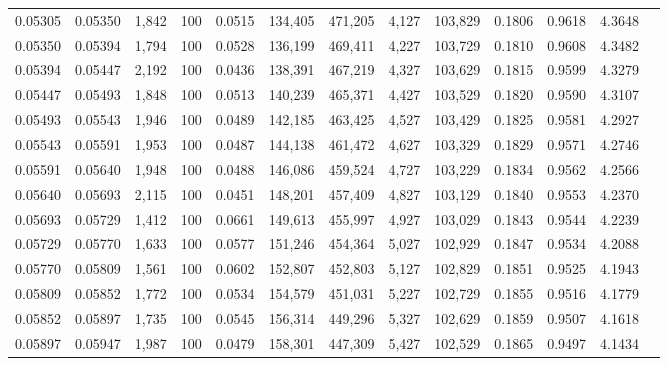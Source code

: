 \begin{tabular}{rrrrrrrrrrrrr}
0.05305 & 0.05350 & 1,842 & 100 &                                     0.0515 & 134,405 & 471,205 &   4,127 & 103,829 & 0.1806 & 0.9618 & 4.3648 \\
0.05350 & 0.05394 & 1,794 & 100 &                                     0.0528 & 136,199 & 469,411 &   4,227 & 103,729 & 0.1810 & 0.9608 & 4.3482 \\
0.05394 & 0.05447 & 2,192 & 100 &                                     0.0436 & 138,391 & 467,219 &   4,327 & 103,629 & 0.1815 & 0.9599 & 4.3279 \\
0.05447 & 0.05493 & 1,848 & 100 &                                     0.0513 & 140,239 & 465,371 &   4,427 & 103,529 & 0.1820 & 0.9590 & 4.3107 \\
0.05493 & 0.05543 & 1,946 & 100 &                                     0.0489 & 142,185 & 463,425 &   4,527 & 103,429 & 0.1825 & 0.9581 & 4.2927 \\
0.05543 & 0.05591 & 1,953 & 100 &                                     0.0487 & 144,138 & 461,472 &   4,627 & 103,329 & 0.1829 & 0.9571 & 4.2746 \\
0.05591 & 0.05640 & 1,948 & 100 &                                     0.0488 & 146,086 & 459,524 &   4,727 & 103,229 & 0.1834 & 0.9562 & 4.2566 \\
0.05640 & 0.05693 & 2,115 & 100 &                                     0.0451 & 148,201 & 457,409 &   4,827 & 103,129 & 0.1840 & 0.9553 & 4.2370 \\
0.05693 & 0.05729 & 1,412 & 100 &                                     0.0661 & 149,613 & 455,997 &   4,927 & 103,029 & 0.1843 & 0.9544 & 4.2239 \\
0.05729 & 0.05770 & 1,633 & 100 &                                     0.0577 & 151,246 & 454,364 &   5,027 & 102,929 & 0.1847 & 0.9534 & 4.2088 \\
0.05770 & 0.05809 & 1,561 & 100 &                                     0.0602 & 152,807 & 452,803 &   5,127 & 102,829 & 0.1851 & 0.9525 & 4.1943 \\
0.05809 & 0.05852 & 1,772 & 100 &                                     0.0534 & 154,579 & 451,031 &   5,227 & 102,729 & 0.1855 & 0.9516 & 4.1779 \\
0.05852 & 0.05897 & 1,735 & 100 &                                     0.0545 & 156,314 & 449,296 &   5,327 & 102,629 & 0.1859 & 0.9507 & 4.1618 \\
0.05897 & 0.05947 & 1,987 & 100 &                                     0.0479 & 158,301 & 447,309 &   5,427 & 102,529 & 0.1865 & 0.9497 & 4.1434 \\

\end{tabular}
